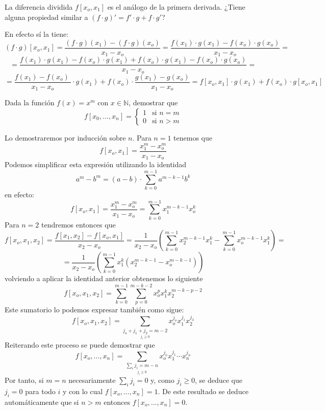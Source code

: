     \begin{ejer}
    La diferencia dividida $f[x_o,x_1]$ es el análogo de la primera derivada. ¿Tiene alguna propiedad similar a $(f\cdot g)'=f'\cdot g+f\cdot g'$?
    \end{ejer}
    \begin{sol}
    En efecto sí la tiene:
    $$(f\cdot g)[x_o,x_1]=\dfrac{(f\cdot g)(x_1)-(f\cdot g)(x_o)}{x_1-x_o}=\dfrac{f(x_1)\cdot g(x_1)-f(x_o)\cdot g(x_o)}{x_1-x_o}=$$
    $$=\dfrac{f(x_1)\cdot g(x_1)-f(x_o)\cdot g(x_1)+f(x_o)\cdot g(x_1)-f(x_o)\cdot g(x_o)}{x_1-x_o}=$$
   $$ =\dfrac{f(x_1) -f(x_o)\ }{x_1-x_o}\cdot g(x_1)+f(x_o)\cdot \dfrac{g(x_1) -g(x_o)}{x_1-x_o}
    =f[x_o,x_1]\cdot g(x_1)+f(x_o)\cdot g[x_o,x_1]$$
    \end{sol}

        \begin{ejer}
 Dada la función $f(x)=x^m$ con $x\in\mathbb{N}$, demostrar que 
 $$f[x_0,\ldots,x_n]=\left\{
 \begin{array}{cc}
   1  & \text{si } n=m \\
    0  & \text{si } n>m
 \end{array}\right.
 $$
        \end{ejer}
        \begin{sol}
        Lo demostraremos por inducción sobre $n$. Para $n=1$ tenemos que
        $$f[x_o,x_1]=\frac{x_1^m-x_o^m}{x_1-x_o}$$
        Podemos simplificar esta expresión utilizando la identidad
        $$a^m-b^m=(a-b)\cdot \sum_{k=0}^{m-1}a^{m-k-1}b^k$$
        en efecto:
        $$f[x_o,x_1]=\frac{x_1^m-x_o^m}{x_1-x_o}=\sum_{k=0}^{m-1}x_1^{m-k-1}x_o^k$$
        Para $n=2$ tendremos entonces que
        $$f[x_o,x_1,x_2]=\frac{f[x_1,x_2]-f[x_o,x_1]}{x_2-x_o}=\frac{1}{x_2-x_o}\left(\sum_{k=0}^{m-1}x_2^{m-k-1}x_1^k-\sum_{k=0}^{m-1}x_o^{m-k-1}x_1^k\right)=$$
        $$=\frac{1}{x_2-x_o}\left(\sum_{k=0}^{m-1}x_1^k(x_2^{m-k-1}-x_o^{m-k-1})\right)$$
        volviendo a aplicar la identidad anterior obtenemos lo siguiente
             $$f[x_o,x_1,x_2]=\sum_{k=0}^{m-1}\sum_{p=0}^{m-k-2}x_o^px_1^kx_2^{m-k-p-2}$$
        Este sumatorio lo podemos expresar también como sigue:
        $$f[x_o,x_1,x_2]=\sum_{\underset{j_i\geq 0}{j_o+j_1+j_2=m-2}}x_o^{j_o}x_1^{j_1}x_2^{j_3}$$
        Reiterando este proceso se puede demostrar que
        $$f[x_o,\ldots,x_n]=\sum_{\underset{j_i\geq 0}{\sum_i j_i=m-n}}x_o^{j_o}x_1^{j_1}\cdots x_n^{j_n}$$
        Por tanto, si $m=n$ necesariamente $\sum_i j_i=0$ y, como $j_i\geq 0$,  se deduce que $j_i=0$ para todo $i$ y con lo cual $f[x_o,\ldots,x_n]=1.$ De este resultado se deduce automáticamente que si $n>m$ entonces $f[x_o,\ldots,x_n]=0$.

        \end{sol}
